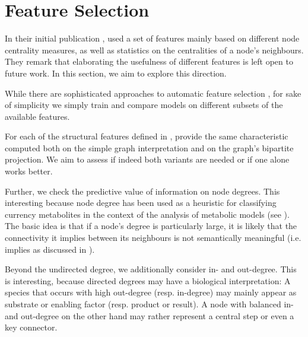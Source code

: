 \documentclass[
	fontsize=10pt, %
	twoside=false, %
	secnumdepth=1, %
  toc=indentunnumbered %
]{kaobook}
\begin{document}
\section{Feature Selection}
\label{sec:feature-selection}


In their initial publication \cite{nielsen_MachineLearningSupport_2019},
\nielsen used a set of features mainly based on different node centrality
measures, as well as statistics on the centralities of a node's neighbours. They
remark that elaborating the usefulness of different features is left open to
future work. In this section, we aim to explore this direction.

While there are sophisticated approaches to automatic feature selection  
\cite{saeys_ReviewFeatureSelection_2007},
for sake of simplicity we simply train and compare models on different subsets
of the available features.

For each of the structural features defined in ,
\nielsen provide the same characteristic computed both on the simple graph
interpretation and on the graph's bipartite projection. We aim to assess if
indeed both variants are needed or if one alone works better.

Further, we check the predictive value of information on node degrees.
This interesting because node degree has been used as a heuristic for
classifying currency metabolites in the context of the analysis of metabolic
models (see ). The basic idea is that if a node's
degree is particularly large, it is likely that the connectivity it implies
between its neighbours is not semantically meaningful (i.e. implies  as discussed in ).

Beyond the undirected degree, we additionally consider in- and out-degree. This
is interesting, because directed degrees may have a biological interpretation: A
species that occurs with high out-degree (resp. in-degree) may mainly appear as
substrate or enabling factor (resp. product or result). A node with balanced in-
and out-degree on the other hand may rather represent a central step or even a
key connector.
\end{document}
